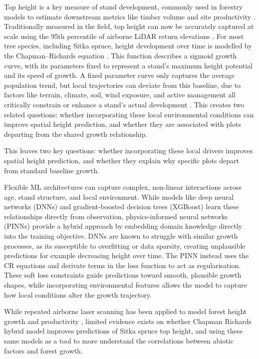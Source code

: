 \documentclass[11pt,a4paper]{report}
\begin{document}
Top height is a key measure of stand development, commonly used in forestry models to estimate downstream metrics like timber volume and site productivity \cite{ForestResearch2026Sitka_C1_SS}. Traditionally measured in the field, top height can now be accurately captured at scale using the 95th percentile of airborne LiDAR return elevations \cite{suarezminguez2008Practical_C1_SS}. For most tree species, including Sitka spruce, height development over time is modelled by the Chapman--Richards equation \cite{pommerening2015Methods_C2_CR}. This function describes a sigmoid growth curve, with its parameters fixed to represent a stand's maximum height potential and its speed of growth. A fixed parameter curve only captures the average population trend, but local trajectories can deviate from this baseline, due to factors like terrain, climate, soil, wind exposure, and active management all critically constrain or enhance a stand's actual development \cite{socha2023Higher_C1_SS, cameron2015Building_C1_SS}. This creates two related questions: whether incorporating these local environmental conditions can improve spatial height prediction, and whether they are associated with plots departing from the shared growth relationship.

This leaves two key questions: whether incorporating these local drivers improves spatial height prediction, and whether they explain why specific plots depart from standard baseline growth.

Flexible ML architectures can capture complex, non-linear interactions across age, stand structure, and local environment. While models like deep neural networks (DNNs) and gradient-boosted decision trees (XGBoost) learn these relationships directly from observation, physics-informed neural networks (PINNs) provide a hybrid approach by embedding domain knowledge directly into the training objective. DNNs are known to struggle with similar growth processes, as its susceptible to overfitting or data sparsity, creating unplausible predictions for example decreasing height over time. The PINN instead uses the CR equations and derivate terms in the loss function to act as regularisation. These soft loss constraints guide predictions toward smooth, plausible growth shapes, while incorporating environmental features allows the model to capture how local conditions alter the growth trajectory. \cite{karpatne2017Theory_C4_NN, pichler2025Inferring_C4_NN}

While repeated airborne laser scanning has been applied to model forest height growth and productivity \cite{Janiec2023ALSHeightGrowth, TymianskaCzabanska2021WeatherHeightGrowth, Tompalski2015ALSProductivity}, limited evidence exists on whether Chapman Richards hybrid model improves predictions of Sitka spruce top height, and using these same models as a tool to more understand the correlations between abiotic factors and forest growth. 
\end{document}

